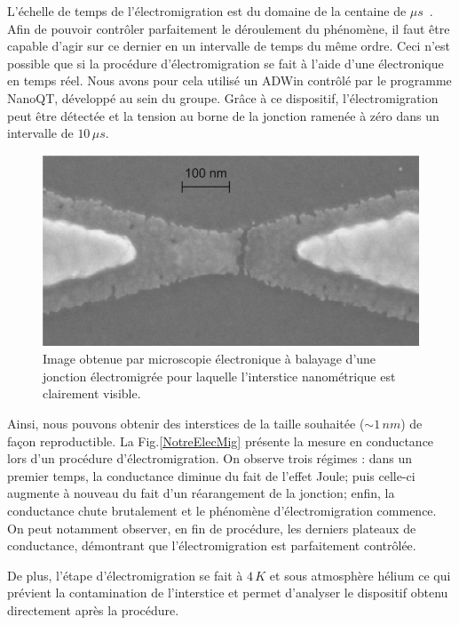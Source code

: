 L'échelle de temps de l'électromigration est du domaine de la centaine de $\mu s$~\cite{ONeill2007}. Afin de pouvoir contrôler parfaitement le déroulement du phénomène, il faut être capable d'agir sur ce dernier en un intervalle de temps du même ordre. Ceci n'est possible que si la procédure d'électromigration se fait à l'aide d'une électronique en temps réel. Nous avons pour cela utilisé un ADWin contrôlé par le programme NanoQT, développé au sein du groupe. Grâce à ce dispositif, l'électromigration peut être détectée et la tension au borne de la jonction ramenée à zéro dans un intervalle de $10\, \mu s$.


\begin{figure}
\parbox{7cm}{
\includegraphics[scale=0.45]{Fabrication/JonctionElecromig/JonctionElecromig.pdf} 
}
\parbox{5cm}{\caption{Image obtenue par microscopie électronique à balayage d'une jonction électromigrée pour laquelle l'interstice nanométrique est clairement visible.}
}
\end{figure}


Ainsi, nous pouvons obtenir des interstices de la taille souhaitée ($\sim 1\,nm$) de façon reproductible. La Fig.\ref{NotreElecMig} présente la mesure en conductance lors d'un procédure d'électromigration. On observe trois régimes : dans un premier temps, la conductance diminue du fait de l'effet Joule; puis celle-ci augmente à nouveau du fait d'un réarangement de la jonction; enfin, la conductance chute brutalement et le phénomène d'électromigration commence. On peut notamment observer, en fin de procédure, les derniers plateaux de conductance, démontrant que l'électromigration est parfaitement contrôlée.

De plus, l'étape d'électromigration se fait à $4\,K$ et sous atmosphère hélium ce qui prévient la contamination de l'interstice et permet d'analyser le dispositif obtenu directement après la procédure.

